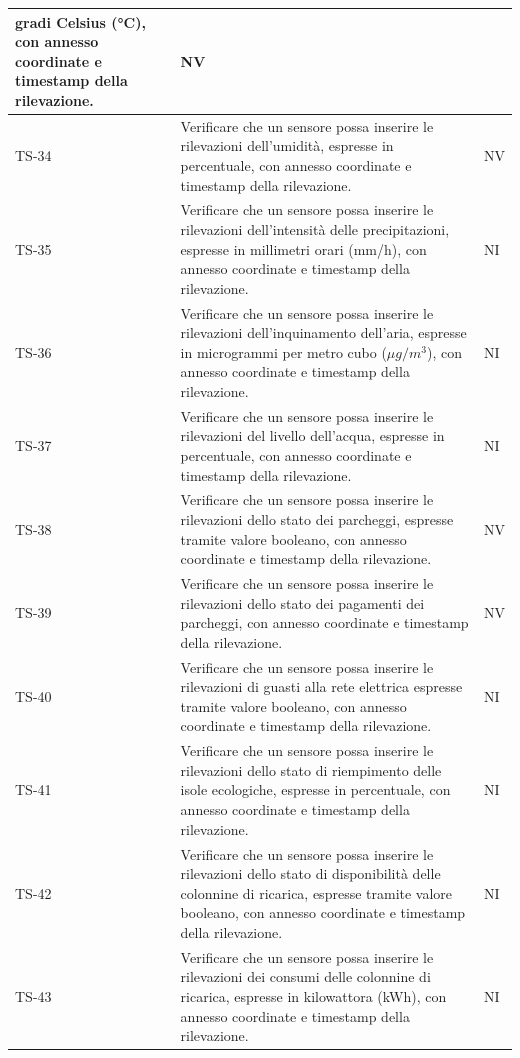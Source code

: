 \documentclass[8pt]{article}
\begin{document}
\begin{longtable}{|>{\centering}p{2cm}|>{\RaggedRight}m{12cm}|>{\centering\arraybackslash}p{2cm}|}
    gradi Celsius (°C), con annesso coordinate e timestamp della rilevazione. & NV \\
    \hline
    TS-34 & Verificare che un sensore possa inserire le rilevazioni dell'umidità, espresse in
    percentuale, con annesso coordinate e timestamp della rilevazione. & NV \\
    \hline
    TS-35 & Verificare che un sensore possa inserire le rilevazioni dell'intensità delle precipitazioni, espresse in
    millimetri orari (mm/h), con annesso coordinate e timestamp della rilevazione. & NI \\
    \hline
    TS-36 & Verificare che un sensore possa inserire le rilevazioni dell'inquinamento dell'aria, espresse in
    microgrammi per metro cubo ($\mu g/m^3$), con annesso coordinate e timestamp della rilevazione. & NI \\
    \hline
    TS-37 & Verificare che un sensore possa inserire le rilevazioni del livello dell'acqua, espresse in
    percentuale, con annesso coordinate e timestamp della rilevazione. & NI \\
    \hline
    TS-38 & Verificare che un sensore possa inserire le rilevazioni dello stato dei parcheggi,
    espresse tramite valore booleano, con annesso coordinate e timestamp della rilevazione. & NV \\
    \hline 
    TS-39 & Verificare che un sensore possa inserire le rilevazioni dello stato dei pagamenti
    dei parcheggi, con annesso coordinate e timestamp della rilevazione. & NV \\
    \hline
    TS-40 & Verificare che un sensore possa inserire le rilevazioni di guasti alla rete elettrica espresse tramite valore booleano, con annesso coordinate e timestamp della rilevazione. & NI \\
    \hline
    TS-41 & Verificare che un sensore possa inserire le rilevazioni dello stato di riempimento delle isole ecologiche,
    espresse in percentuale, con annesso coordinate e timestamp della rilevazione. & NI \\
    \hline
    TS-42 & Verificare che un sensore possa inserire le rilevazioni dello stato di disponibilità delle colonnine di ricarica,
    espresse tramite valore booleano, con annesso coordinate e timestamp della rilevazione. & NI \\
    \hline
    TS-43 & Verificare che un sensore possa inserire le rilevazioni dei consumi delle colonnine di ricarica,
    espresse in kilowattora (kWh), con annesso coordinate e timestamp della rilevazione. & NI \\

\end{longtable}
\end{document}
